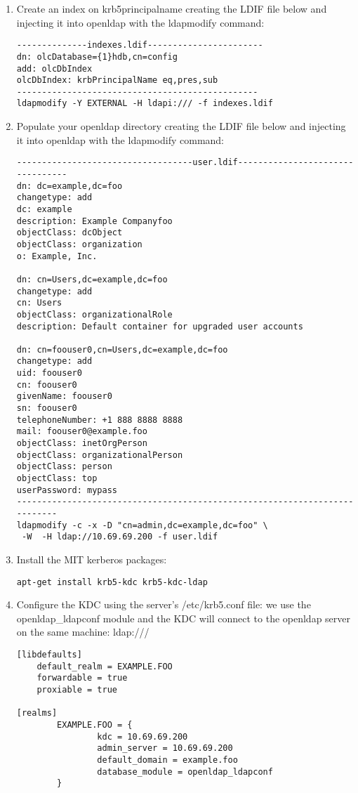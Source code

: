 \documentclass[12pt,a4]{article}
\begin{document}
\begin{enumerate}
\item Create an index on krb5principalname creating the LDIF file below and injecting it into openldap with the ldapmodify command:
\begin{verbatim}
--------------indexes.ldif-----------------------
dn: olcDatabase={1}hdb,cn=config
add: olcDbIndex
olcDbIndex: krbPrincipalName eq,pres,sub
------------------------------------------------
ldapmodify -Y EXTERNAL -H ldapi:/// -f indexes.ldif
\end{verbatim}


\item Populate your openldap directory creating the LDIF file below and injecting it into openldap with the ldapmodify command:
\begin{verbatim}
-----------------------------------user.ldif---------------------------------
dn: dc=example,dc=foo
changetype: add
dc: example
description: Example Companyfoo
objectClass: dcObject
objectClass: organization
o: Example, Inc.

dn: cn=Users,dc=example,dc=foo
changetype: add
cn: Users
objectClass: organizationalRole
description: Default container for upgraded user accounts

dn: cn=foouser0,cn=Users,dc=example,dc=foo
changetype: add
uid: foouser0
cn: foouser0
givenName: foouser0
sn: foouser0
telephoneNumber: +1 888 8888 8888
mail: foouser0@example.foo
objectClass: inetOrgPerson
objectClass: organizationalPerson
objectClass: person
objectClass: top
userPassword: mypass
---------------------------------------------------------------------------
ldapmodify -c -x -D "cn=admin,dc=example,dc=foo" \
 -W  -H ldap://10.69.69.200 -f user.ldif
\end{verbatim}




\item Install the  MIT kerberos packages:
\begin{verbatim}
apt-get install krb5-kdc krb5-kdc-ldap
\end{verbatim}

\item Configure the KDC using the server's /etc/krb5.conf file: we use the openldap\_ldapconf module and the KDC will connect to the openldap server on the same machine: ldap:///
\begin{verbatim}
[libdefaults]
	default_realm = EXAMPLE.FOO
	forwardable = true
	proxiable = true

[realms]
        EXAMPLE.FOO = {
                kdc = 10.69.69.200
                admin_server = 10.69.69.200
                default_domain = example.foo
                database_module = openldap_ldapconf
        }


\end{verbatim}
\end{enumerate}
\end{document}
